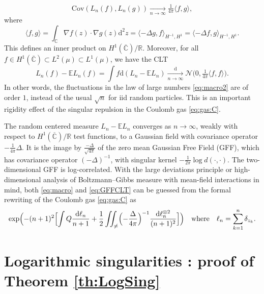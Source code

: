\documentclass[10pt,reqno]{amsart}
\numberwithin{equation}{section}
\numberwithin{figure}{section}
\theoremstyle{plain}
\newcommand{\<}{\langle}
\renewcommand{\>}{\rangle}
\begin{document}
\begin{equation}\label{eq:GFFCLT:cov}
  \mathrm{Cov}(L_n(f),L_n(g))
  \xrightarrow[n\to\infty]{}
  \tfrac{1}{4\pi}\langle
  f,g\rangle,
\end{equation}
where
\begin{equation}
  \langle f,g\rangle
  =\int_{\mathbb{C}} \nabla f(z)\cdot\nabla g(z) \mathrm{d}^2z
  =\langle -\Delta g,f\rangle_{H^{-1},H^1}
  =\langle -\Delta f,g\rangle_{H^{-1},H^1}.
\end{equation}
This defines an inner product on $H^1(\overline{\mathbb{C}})/\mathbb{R}$.
Moreover, for all $f\in H^1(\overline{\mathbb{C}})\subset L^2(\mu)\subset L^1(\mu)$, we have the CLT
\begin{equation}\label{eq:GFFCLT}
 L_n(f)-\mathbb{E}L_n(f)
 =  \int f\mathrm{d}(L_n-\mathbb{E}L_n)
 \xrightarrow[n\to\infty]{\mathrm{d}}\mathcal{N}\bigl(0,\tfrac{1}{4\pi}\langle f,f\rangle\bigr).
\end{equation}
In other words, the fluctuations in the law of large numbers \eqref{eq:macro2}
are of order $1$, instead of the usual $\sqrt{n}$ for iid random particles. This is an important rigidity effect of the singular repulsion in the Coulomb gas \eqref{eq:gas:C}. 
%

%
%

The random centered measure $L_n-\mathbb{E}L_n$ converges as
$n\to\infty$, weakly with respect to $H^1(\overline{\mathbb{C}})/\mathbb{R}$ test functions, to a Gaussian
field with covariance operator $-\frac{1}{4\pi}\Delta$. It is the image by $\frac{-\Delta}{\sqrt{4\pi}}$ of the zero mean Gaussian Free Field (GFF), which has covariance operator
$(-\Delta)^{-1}$, with singular kernel $-\frac{1}{2\pi}\log d(\cdot,\cdot)$. The two-dimensional GFF is log-correlated. With the large deviations principle or high-dimensional analysis of
Boltzmann--Gibbs measure with mean-field interactions in mind, both
\eqref{eq:macro} and \eqref{eq:GFFCLT} can be guessed from the formal
rewriting of the Coulomb gas \eqref{eq:gas:C} as
\begin{equation}
  \exp\Bigl(-(n+1)^2\Bigl[\int Q\frac{\mathrm{d}\ell_n}{n+1}
  +\frac{1}{2}\iint_{\neq}\Bigl(-\frac{\Delta}{4\pi}\Bigr)^{-1}\frac{\mathrm{d}\ell_n^{\otimes 2}}{(n+1)^2}\Bigr]\Bigr)
  \quad\text{where}\quad
  \ell_n=\sum_{k=1}^n\delta_{z_k}.
\end{equation}

\section{Logarithmic singularities : proof of Theorem \ref{th:LogSing}}
\label{se:proof:th:LogSing}
\end{document}
